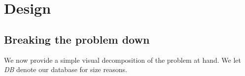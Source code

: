 \pagestyle{fancy}
\chead{\sffamily \thepage}

\usetikzlibrary{positioning}

\chapter{Design}

\section{Breaking the problem down}
\label{sec:breakdown}

We now provide a simple visual decomposition of the problem at 
hand. We let \textit{DB} denote our database for size reasons.

